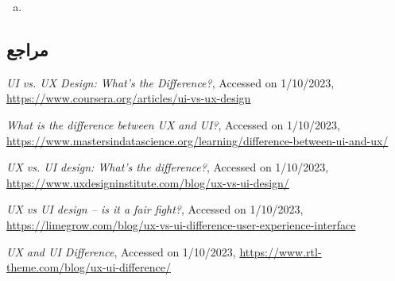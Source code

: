 {\begin{enumerate}[a)]
درنهایت باید تاکید کرد که رابط کاربری و تجربه‌ی کاربری مکمل یکدیگر هستند و هردو برای تولید یک محصول رضایت‌بخش ضروری‌اند و نمی‌توان یکی را به دیگری برتری داد.
	\item 

\end{enumerate}


\subsection*{مراجع}

\begin{latin}
	\begingroup
	\renewcommand{\section}[2]{}%
	
\begin{thebibliography}{9}
	\textit{UI vs. UX Design: What’s the Difference?},
	Accessed on 1/10/2023,
	\url{https://www.coursera.org/articles/ui-vs-ux-design}
	
	\textit{What is the difference between UX and UI?},
	Accessed on 1/10/2023,
	\url{https://www.mastersindatascience.org/learning/difference-between-ui-and-ux/}
	
	\textit{UX vs. UI design: What’s the difference?},
	Accessed on 1/10/2023,
	\url{https://www.uxdesigninstitute.com/blog/ux-vs-ui-design/}
	
	\textit{UX vs UI design – is it a fair fight?},
	Accessed on 1/10/2023,
	\url{https://limegrow.com/blog/ux-vs-ui-difference-user-experience-interface}
	
	\textit{UX and UI Difference},
	Accessed on 1/10/2023,
	\url{https://www.rtl-theme.com/blog/ux-ui-difference/}
\end{thebibliography}
\endgroup
\end{latin}

}
